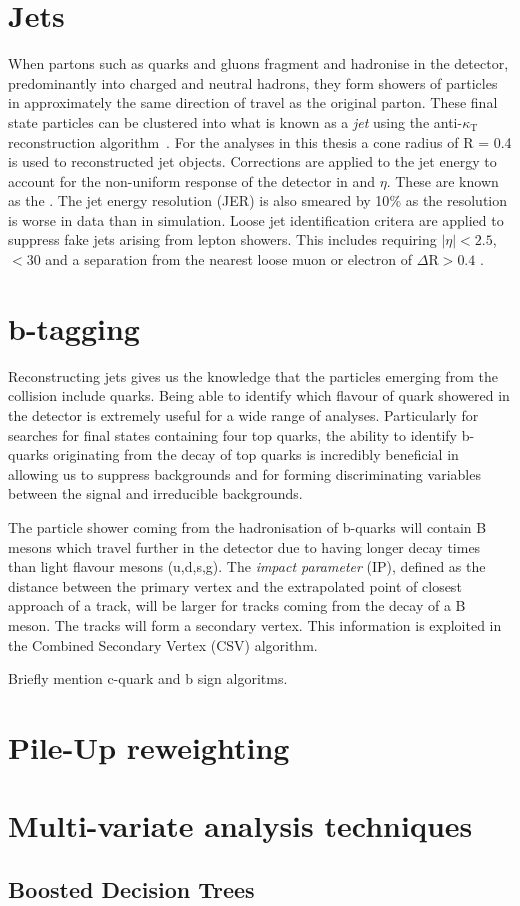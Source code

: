 \section{Jets}
When partons such as quarks and gluons fragment and hadronise in the detector, predominantly into charged and neutral hadrons, they form showers of particles in approximately the same direction of travel as the original parton. These final state particles can be clustered into what is known as a \emph{jet} using the anti-$\kappa_{\textrm{T}}$ reconstruction algorithm~\cite{Cacciari:2008gp}. For the analyses in this thesis a cone radius of R = 0.4 is used to reconstructed jet objects. Corrections are applied to the jet energy to account for the non-uniform response of the detector in \pt and $\eta$. These are known as the . The jet energy resolution (JER) is also smeared by 10$\%$ as the resolution is worse in data than in simulation. Loose jet identification critera are applied to suppress fake jets arising from lepton showers. This includes requiring $|\eta|<2.5$, \pt$<30$ and a separation from the nearest loose muon or electron of $\Delta\textrm{R}>0.4$ .

\section{b-tagging}
Reconstructing jets gives us the knowledge that the particles emerging from the collision include quarks. Being able to identify which flavour of quark showered in the detector is extremely useful for a wide range of analyses. Particularly for searches for final states containing four top quarks, the ability to identify b-quarks originating from the decay of top quarks is incredibly beneficial in allowing us to suppress backgrounds and for forming discriminating variables between the signal and irreducible backgrounds. 

The particle shower coming from the hadronisation of b-quarks will contain B mesons which travel further in the detector due to having longer decay times than light flavour mesons (u,d,s,g). The \emph{impact parameter} (IP), defined as the distance between the primary vertex and the extrapolated point of closest approach of a track, will be larger for tracks coming from the decay of a B meson. The tracks will form a secondary vertex. This information is exploited in the Combined Secondary Vertex (CSV) algorithm.

Briefly mention c-quark and b sign algoritms.

\section{Pile-Up reweighting}
\label{sec:pile-up}

\section{Multi-variate analysis techniques}
\subsection{Boosted Decision Trees}
\label{sec:BDT}